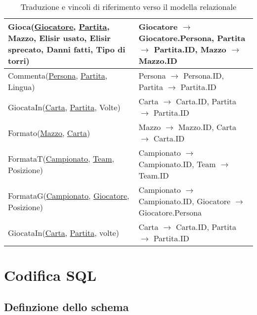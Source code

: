 \documentclass{article}
\begin{document}
\begin{table}
\begin{tabularx}{\textwidth}{|X|X|}
        Gioca(\underline{Giocatore}, \underline{Partita}, Mazzo, Elisir usato, Elisir sprecato, Danni fatti, Tipo di torri) & Giocatore $\xrightarrow{}$ Giocatore.Persona, Partita $\xrightarrow{}$ Partita.ID, Mazzo $\xrightarrow{}$ Mazzo.ID \\ \hline
        Commenta(\underline{Persona}, \underline{Partita}, Lingua) & Persona $\xrightarrow{}$ Persona.ID, Partita $\xrightarrow{}$ Partita.ID \\ \hline
        GiocataIn(\underline{Carta}, \underline{Partita}, Volte) & Carta $\xrightarrow{}$ Carta.ID, Partita $\xrightarrow{}$ Partita.ID \\ \hline
        Formato(\underline{Mazzo}, \underline{Carta}) & Mazzo $\xrightarrow{}$ Mazzo.ID, Carta $\xrightarrow{}$ Carta.ID \\ \hline
        FormataT(\underline{Campionato}, \underline{Team}, Posizione) & Campionato $\xrightarrow{}$ Campionato.ID, Team $\xrightarrow{}$ Team.ID \\ \hline
        FormataG(\underline{Campionato}, \underline{Giocatore}, Posizione) & Campionato $\xrightarrow{}$ Campionato.ID, Giocatore $\xrightarrow{}$ Giocatore.Persona \\ \hline
        GiocataIn(\underline{Carta}, \underline{Partita}, volte) & Carta $\xrightarrow{}$ Carta.ID, Partita $\xrightarrow{}$ Partita.ID \\ \hline
    \end{tabularx}
    \caption{Traduzione e vincoli di riferimento verso il modella relazionale}
    \label{table_traduzione_vincoli_riferimento}
\end{table}

\section{Codifica SQL}

\subsection{Definzione dello schema}
\end{document}
